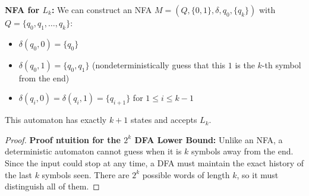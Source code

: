 \begin{example}
    \textbf{NFA for $L_k$:} We can construct an NFA $M = (Q, \{0, 1\}, \delta, q_0, \{q_k\})$
    with $Q = \{q_0, q_1, \dots, q_k\}$:
    \begin{itemize}
        \item $\delta(q_0, 0) = \{q_0\}$
        \item $\delta(q_0, 1) = \{q_0, q_1\}$ (nondeterministically guess that this $1$ is the $k$-th symbol from the end)
        \item $\delta(q_i, 0) = \delta(q_i, 1) = \{q_{i+1}\}$ for $1 \le i \le k - 1$
    \end{itemize}
    This automaton has exactly $k + 1$ states and accepts $L_k$.
\end{example}

\begin{proof}
    \textbf{Proof ntuition for the $2^k$ DFA Lower Bound:}
    Unlike an NFA, a deterministic automaton cannot guess when it is $k$ symbols away from the end. 
    Since the input could stop at any time, a DFA must maintain the exact history of the last $k$ symbols seen. There are $2^k$ possible words of length $k$, so it must distinguish all of them.
\end{proof}
